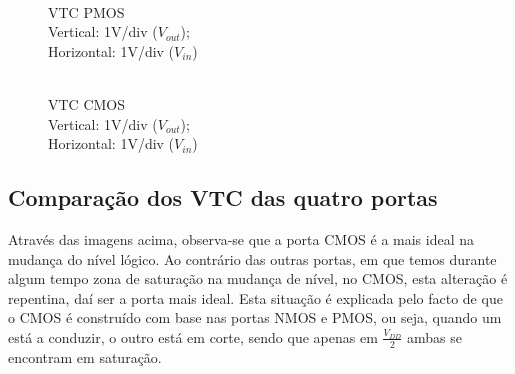 \documentclass[pdftex,12pt,a4paper]{report}
\begin{document}
\begin{figure}[!htb]
  \centerline{}
  \caption{\\VTC PMOS \\Vertical: 1V/div ($V_{out}$); \\Horizontal: 1V/div ($V_{in}$)}
\endminipage\hfill
{}
  \centerline{}
  \caption{\\VTC CMOS \\Vertical: 1V/div ($V_{out}$); \\Horizontal: 1V/div ($V_{in}$)}
\endminipage\hfill
\end{figure}

\newpage
\subsection{Comparação dos VTC das quatro portas}
Através das imagens acima, observa-se que a porta CMOS é a mais ideal na mudança do nível lógico. Ao contrário das outras portas, em que temos durante algum tempo zona de saturação na mudança de nível, no CMOS, esta alteração é repentina, daí ser a porta mais ideal. Esta situação é explicada pelo facto de que o CMOS é construído com base nas portas NMOS e PMOS, ou seja, quando um está a conduzir, o outro está em corte, sendo que apenas em  $\frac{V_{DD}}{2}$ ambas se encontram em saturação.
\end{document}
